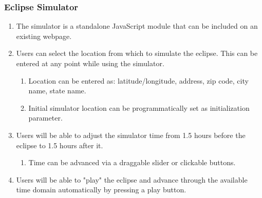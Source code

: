 \documentclass[10pt, onecolumn, draftclsnofoot, letterpaper, compsoc]{IEEEtran}
\begin{document}
\subsubsection{Eclipse Simulator}
	\begin{enumerate}
		\item The simulator is a standalone JavaScript module that can
		be included on an existing webpage.

		\item Users can select the location from which to simulate the eclipse.
		This can be entered at any point while using the simulator.
		\begin{enumerate}
			\item Location can be entered as: latitude/longitude, address, zip code,
			city name, state name.
			\item Initial simulator location can be programmatically set as
			initialization parameter.
		\end{enumerate}

		\item Users will be able to adjust the simulator time from 1.5 hours before
		the eclipse to 1.5 hours after it.
		\begin{enumerate}
			\item Time can be advanced via a draggable slider or clickable buttons.
		\end{enumerate}

        \item Users will be able to "play" the eclipse and advance through the available time
        domain automatically by pressing a play button.

	\end{enumerate}
\end{document}
